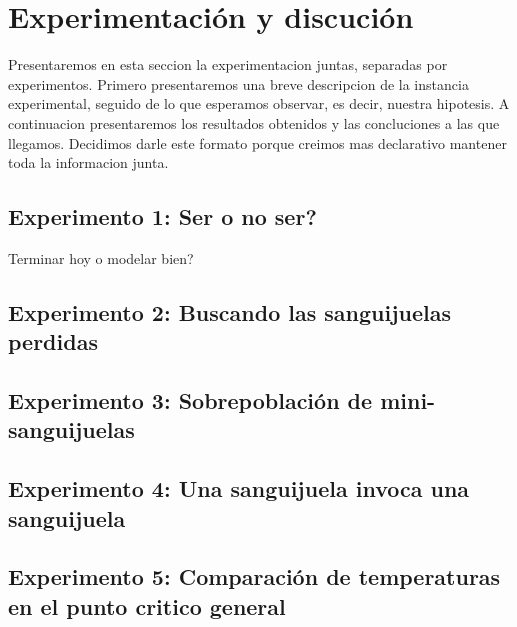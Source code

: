 \section{Experimentaci\'on y discuci\'on}

Presentaremos en esta seccion la experimentacion juntas, separadas por experimentos. Primero presentaremos una breve descripcion de la instancia 
experimental, seguido de lo que esperamos observar, es decir, nuestra hipotesis. A continuacion presentaremos los resultados obtenidos y las
concluciones a las que llegamos. Decidimos darle este formato porque creimos mas declarativo mantener toda la informacion junta. 

\subsection{Experimento 1: Ser o no ser?}

Terminar hoy o modelar bien?

\subsection{Experimento 2: Buscando las sanguijuelas perdidas}

\subsection{Experimento 3: Sobrepoblaci\'on de mini-sanguijuelas}

\subsection{Experimento 4: Una sanguijuela invoca una sanguijuela}

\subsection{Experimento 5: Comparaci\'on de temperaturas en el punto critico general}